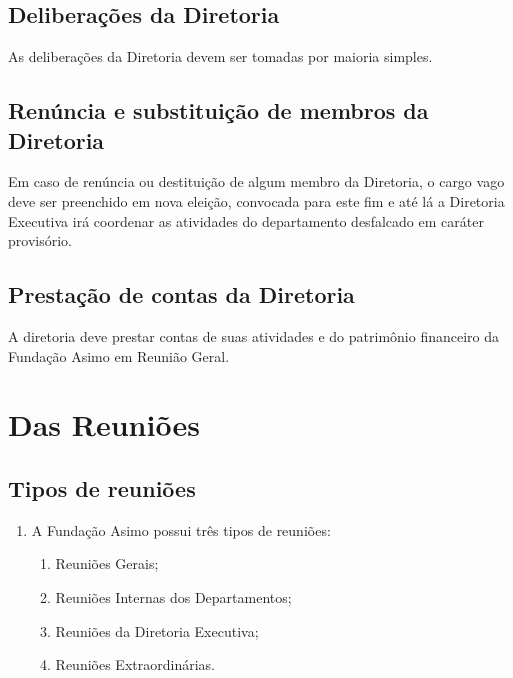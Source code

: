     \subsection{Deliberações da Diretoria}
        As deliberações da Diretoria devem ser tomadas por maioria simples.
    \subsection{Renúncia e substituição de membros da Diretoria}
        Em caso de renúncia ou destituição de algum membro da Diretoria, o cargo vago deve ser preenchido em nova eleição, convocada para este fim e até lá a Diretoria Executiva irá coordenar as atividades do departamento desfalcado em caráter provisório.
    \subsection{Prestação de contas da Diretoria}
        A diretoria deve prestar contas de suas atividades e do patrimônio financeiro da Fundação Asimo em Reunião Geral.
\section{Das Reuniões}
    \subsection{Tipos de reuniões}
    \begin{enumerate}
        \item A Fundação Asimo possui três tipos de reuniões:
        \begin{enumerate}
            \item Reuniões Gerais;
            \item Reuniões Internas dos Departamentos;
            \item Reuniões da Diretoria Executiva;
            \item Reuniões Extraordinárias.
        \end{enumerate}
    \end{enumerate}
